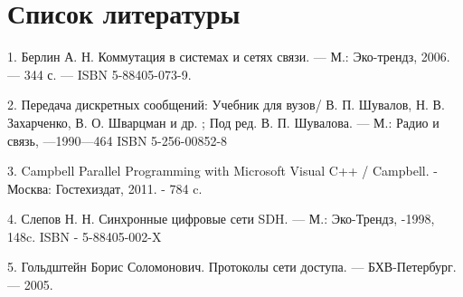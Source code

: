 \documentclass[utf8,14pt,a4paper,oneside,russian]{book}
\begin{document}
	\newpage
	\section{Список литературы}
	
	1. Берлин А. Н. Коммутация в системах и сетях связи. — М.: Эко-трендз, 2006. — 344 с. — ISBN 5-88405-073-9.
	
	2. Передача дискретных сообщений: Учебник для вузов/ В. П. Шувалов, Н. В. Захарченко, В. О. Шварцман и др. ; Под ред. В. П. Шувалова. — М.: Радио и связь, —1990—464 ISBN 5-256-00852-8
	
	3. Campbell Parallel Programming with Microsoft Visual C++ / Campbell. - Москва: Гостехиздат, 2011. - 784 c.
	
	4. Слепов Н. Н. Синхронные цифровые сети SDH. — М.: Эко-Трендз, -1998, 148c. ISBN - 5-88405-002-X
	
	5. Гольдштейн Борис Соломонович. Протоколы сети доступа. — БХВ-Петербург. — 2005.
		
\end{document}
